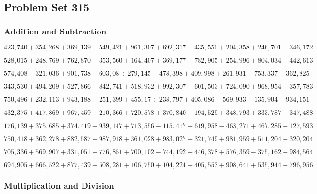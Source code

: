 \hypertarget{problem-set-315}{%
\subsection{Problem Set 315}\label{problem-set-315}}

\hypertarget{addition-and-subtraction}{%
\subsubsection{Addition and
Subtraction}\label{addition-and-subtraction}}

\(423,740+354,268+369,139+549,421+961,307+692,317+435,550+204,358+246,701+346,172\)

\(528,015+248,769+762,870+353,560+164,407+369,177+782,905+254,996+804,034+442,613\)

\(574,408-321,036+901,738+603,08÷279,145-478,398+409,998+261,931+753,337-362,825\)

\(343,530+494,209+527,866+842,741+518,932+992,307+601,503+724,090+968,954+357,783\)

\(750,496+232,113+943,188-251,399+455,17÷238,797+405,086-569,933-135,904+934,151\)

\(432,375+417,869+967,459+210,366+720,578+370,840+194,529+348,793+333,787+347,488\)

\(176,139+375,685+374,419+939,147+713,556-115,417-619,958-463,271+467,285-127,593\)

\(750,418+362,278+882,587+987,918+361,028+983,027+321,749+981,959+511,204+320,204\)

\(705,336+569,907+331,051+776,851+700,102-744,192-446,378+576,359-375,162-984,564\)

\(694,905+666,522+877,439+508,281+106,750+104,224+405,553+908,641+535,944+796,956\)

\hypertarget{multiplication-and-division}{%
\subsubsection{Multiplication and
Division}\label{multiplication-and-division}}

